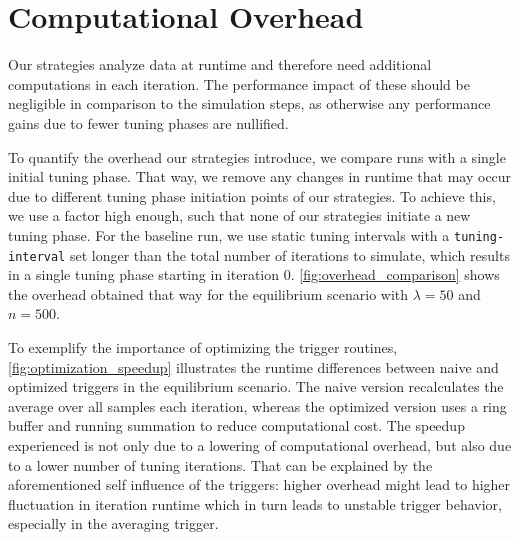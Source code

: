 \section{Computational Overhead}
\label{sec:overhead_results}
Our strategies analyze data at runtime and therefore need additional computations in each iteration. The performance impact of these should be negligible in comparison to the simulation steps, as otherwise any performance gains due to fewer tuning phases are nullified.

To quantify the overhead our strategies introduce, we compare runs with a single initial tuning phase. That way, we remove any changes in runtime that may occur due to different tuning phase initiation points of our strategies. To achieve this, we use a factor high enough, such that none of our strategies initiate a new tuning phase. For the baseline run, we use static tuning intervals with a \texttt{tuning-interval} set longer than the total number of iterations to simulate, which results in a single tuning phase starting in iteration \num{0}. \autoref{fig:overhead_comparison} shows the overhead obtained that way for the equilibrium scenario with $\lambda=50$ and $n=500$.


To exemplify the importance of optimizing the trigger routines, \autoref{fig:optimization_speedup} illustrates the runtime differences between naive and optimized triggers in the equilibrium scenario. The naive version recalculates the average over all samples each iteration, whereas the optimized version uses a ring buffer and running summation to reduce computational cost.
The speedup experienced is not only due to a lowering of computational overhead, but also due to a lower number of tuning iterations. That can be explained by the aforementioned self influence of the triggers: higher overhead might lead to higher fluctuation in iteration runtime which in turn leads to unstable trigger behavior, especially in the averaging trigger.

